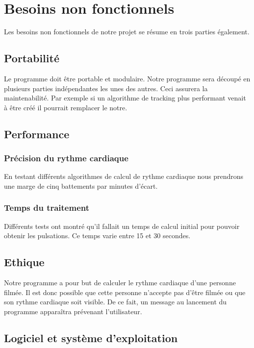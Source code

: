 \documentclass[12pt,a4paper]{article}
\begin{document}
\section{Besoins non fonctionnels}

Les besoins non fonctionnels de notre projet se résume en trois parties également.
\subsection{Portabilité}
Le programme doit être portable et modulaire. Notre programme sera découpé en plusieurs parties indépendantes les unes des autres. Ceci assurera la maintenabilité. Par exemple si un algorithme de tracking plus performant venait à être créé il pourrait remplacer le notre.

\subsection{Performance}

\subsubsection{Précision du rythme cardiaque}

En testant différents algorithmes de calcul de rythme cardiaque nous prendrons une marge de cinq battements par minutes d'écart.
\subsubsection{Temps du traitement}

Différents tests ont montré qu'il fallait un temps de calcul initial pour pouvoir obtenir les pulsations. Ce temps varie entre 15 et 30 secondes.

\subsection{Ethique}

Notre programme a pour but de calculer le rythme cardiaque d'une personne filmée. Il est donc possible que cette personne n'accepte pas d'être filmée ou que son rythme cardiaque soit visible. De ce fait, un message au lancement du programme apparaîtra prévenant l'utilisateur.
\newpage
\subsection{Logiciel et système d'exploitation}
\end{document}
